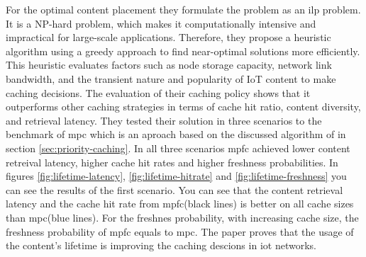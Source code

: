 \documentclass[conference]{IEEEtran}
\begin{document}
	For the optimal content placement they formulate the problem as an \ac{ilp} problem. It is a NP-hard problem, which makes it computationally intensive and impractical for large-scale applications. Therefore, they propose a heuristic algorithm using a greedy approach to find near-optimal solutions more efficiently. This heuristic evaluates factors such as node storage capacity, network link bandwidth, and the transient nature and popularity of IoT content to make caching decisions.
	The evaluation of their caching policy shows that it outperforms other caching strategies in terms of cache hit ratio, content diversity, and retrieval latency. They tested their solution in three scenarios to the benchmark of \ac{mpc} which is an aproach based on the discussed algorithm of \cite{caching-8} in section \ref{sec:priority-caching}. In all three scenarios \ac{mpfc} achieved lower content retreival latency, higher cache hit rates and higher freshness probabilities.
	In figures \ref{fig:lifetime-latency}, \ref{fig:lifetime-hitrate} and \ref{fig:lifetime-freshness} you can see the results of the first scenario. You can see that the content retrieval latency and the cache hit rate from \ac{mpfc}(black lines) is better on all cache sizes than \ac{mpc}(blue lines). For the freshnes probability, with increasing cache size, the freshness probability of \ac{mpfc} equals to \ac{mpc}. The paper proves that the usage of the content's lifetime is improving the caching descions in \ac{iot} networks.
\end{document}
